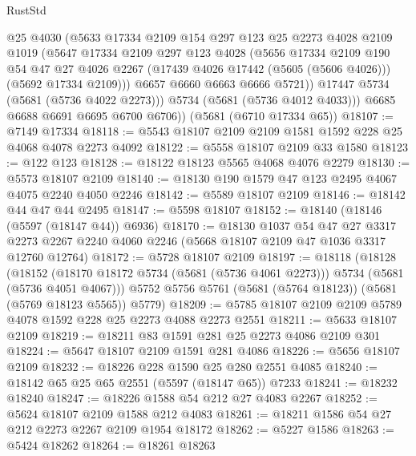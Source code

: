\begin{lexlean}{RustStd}
\begin{coremodule}
              @25
              @4030
              (@5633
                @17334
                @2109
                @154
                @297
                @123
                @25
                @2273
                @4028
                @2109
                @1019
                (@5647
                  @17334
                  @2109
                  @297
                  @123
                  @4028
                  (@5656
                    @17334
                    @2109
                    @190
                    @54
                    @47
                    @27
                    @4026
                    @2267
                    (@17439 @4026 @17442 (@5605 (@5606 @4026)))
                    (@5692 @17334 @2109)))
                @6657
                @6660
                @6663
                @6666
                @5721))
            @17447
            @5734
            (@5681 (@5736 @4022 @2273)))
          @5734
          (@5681 (@5736 @4012 @4033)))
        @6685
        @6688
        @6691
        @6695
        @6700
        @6706))
    (@5681 (@6710 @17334 @65))
@18107 := @7149 @17334
@18118 := @5543 @18107 @2109 @2109 @1581 @1592 @228 @25 @4068 @4078 @2273 @4092
@18122 := @5558 @18107 @2109 @33 @1580
@18123 := @122 @123
@18128 := @18122 @18123 @5565 @4068 @4076 @2279
@18130 := @5573 @18107 @2109
@18140 := @18130 @190 @1579 @47 @123 @2495 @4067 @4075 @2240 @4050 @2246
@18142 := @5589 @18107 @2109
@18146 := @18142 @44 @47 @44 @2495
@18147 := @5598 @18107
@18152 := @18140 (@18146 (@5597 (@18147 @44)) @6936)
@18170 := @18130
    @1037
    @54
    @47
    @27
    @3317
    @2273
    @2267
    @2240
    @4060
    @2246
    (@5668 @18107 @2109 @47 @1036 @3317 @12760 @12764)
@18172 := @5728 @18107 @2109
@18197 := @18118
    (@18128
      (@18152 (@18170 @18172 @5734 (@5681 (@5736 @4061 @2273))) @5734 (@5681 (@5736 @4051 @4067)))
      @5752
      @5756
      @5761
      (@5681 (@5764 @18123))
      (@5681 (@5769 @18123 @5565))
      @5779)
@18209 := @5785 @18107 @2109 @2109 @5789 @4078 @1592 @228 @25 @2273 @4088 @2273 @2551
@18211 := @5633 @18107 @2109
@18219 := @18211 @83 @1591 @281 @25 @2273 @4086 @2109 @301
@18224 := @5647 @18107 @2109 @1591 @281 @4086
@18226 := @5656 @18107 @2109
@18232 := @18226 @228 @1590 @25 @280 @2551 @4085
@18240 := @18142 @65 @25 @65 @2551 (@5597 (@18147 @65)) @7233
@18241 := @18232 @18240
@18247 := @18226 @1588 @54 @212 @27 @4083 @2267
@18252 := @5624 @18107 @2109 @1588 @212 @4083
@18261 := @18211 @1586 @54 @27 @212 @2273 @2267 @2109 @1954 @18172
@18262 := @5227 @1586
@18263 := @5424 @18262
@18264 := @18261 @18263

\end{coremodule}
\end{lexlean}
